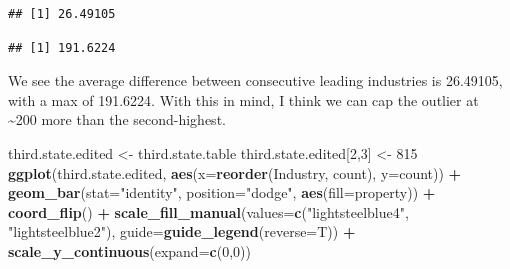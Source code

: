 \documentclass[]{article}
\newenvironment{Shaded}{\begin{snugshade}}{\end{snugshade}}
\newcommand{\KeywordTok}[1]{\textcolor[rgb]{0.13,0.29,0.53}{\textbf{#1}}}
\newcommand{\DataTypeTok}[1]{\textcolor[rgb]{0.13,0.29,0.53}{#1}}
\newcommand{\DecValTok}[1]{\textcolor[rgb]{0.00,0.00,0.81}{#1}}
\newcommand{\StringTok}[1]{\textcolor[rgb]{0.31,0.60,0.02}{#1}}
\newcommand{\OperatorTok}[1]{\textcolor[rgb]{0.81,0.36,0.00}{\textbf{#1}}}
\newcommand{\NormalTok}[1]{#1}
\begin{document}
\begin{verbatim}
## [1] 26.49105
\end{verbatim}

\begin{Shaded}
\end{Shaded}

\begin{verbatim}
## [1] 191.6224
\end{verbatim}

We see the average difference between consecutive leading industries is
26.49105, with a max of 191.6224. With this in mind, I think we can cap
the outlier at \textasciitilde{}200 more than the second-highest.

\begin{Shaded}
\begin{Highlighting}[]
\NormalTok{third.state.edited <-}\StringTok{ }\NormalTok{third.state.table}
\NormalTok{third.state.edited[}\DecValTok{2}\NormalTok{,}\DecValTok{3}\NormalTok{] <-}\StringTok{ }\DecValTok{815}
\KeywordTok{ggplot}\NormalTok{(third.state.edited, }\KeywordTok{aes}\NormalTok{(}\DataTypeTok{x=}\KeywordTok{reorder}\NormalTok{(Industry, count), }\DataTypeTok{y=}\NormalTok{count)) }\OperatorTok{+}
\StringTok{  }\KeywordTok{geom_bar}\NormalTok{(}\DataTypeTok{stat=}\StringTok{"identity"}\NormalTok{, }\DataTypeTok{position=}\StringTok{"dodge"}\NormalTok{, }\KeywordTok{aes}\NormalTok{(}\DataTypeTok{fill=}\NormalTok{property)) }\OperatorTok{+}
\StringTok{  }\KeywordTok{coord_flip}\NormalTok{() }\OperatorTok{+}
\StringTok{  }\KeywordTok{scale_fill_manual}\NormalTok{(}\DataTypeTok{values=}\KeywordTok{c}\NormalTok{(}\StringTok{"lightsteelblue4"}\NormalTok{, }\StringTok{"lightsteelblue2"}\NormalTok{), }\DataTypeTok{guide=}\KeywordTok{guide_legend}\NormalTok{(}\DataTypeTok{reverse=}\NormalTok{T)) }\OperatorTok{+}
\StringTok{  }\KeywordTok{scale_y_continuous}\NormalTok{(}\DataTypeTok{expand=}\KeywordTok{c}\NormalTok{(}\DecValTok{0}\NormalTok{,}\DecValTok{0}\NormalTok{))}
\end{Highlighting}
\end{Shaded}
\end{document}
